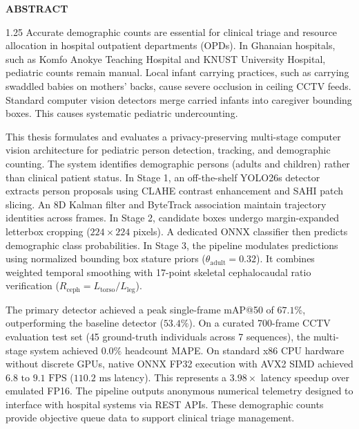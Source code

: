 \begin{center}
    {\bfseries\Large ABSTRACT}
\end{center}
\vspace{0.4cm}

\begin{spacing}{1.25}
Accurate demographic counts are essential for clinical triage and resource allocation in hospital outpatient departments (OPDs). In Ghanaian hospitals, such as Komfo Anokye Teaching Hospital and KNUST University Hospital, pediatric counts remain manual. Local infant carrying practices, such as carrying swaddled babies on mothers' backs, cause severe occlusion in ceiling CCTV feeds. Standard computer vision detectors merge carried infants into caregiver bounding boxes. This causes systematic pediatric undercounting.

This thesis formulates and evaluates a privacy-preserving multi-stage computer vision architecture for pediatric person detection, tracking, and demographic counting. The system identifies demographic persons (adults and children) rather than clinical patient status. In Stage 1, an off-the-shelf YOLO26s detector extracts person proposals using CLAHE contrast enhancement and SAHI patch slicing. An 8D Kalman filter and ByteTrack association maintain trajectory identities across frames. In Stage 2, candidate boxes undergo margin-expanded letterbox cropping ($224 \times 224$ pixels). A dedicated ONNX classifier then predicts demographic class probabilities. In Stage 3, the pipeline modulates predictions using normalized bounding box stature priors ($\theta_{\text{adult}} = 0.32$). It combines weighted temporal smoothing with 17-point skeletal cephalocaudal ratio verification ($R_{\text{ceph}} = L_{\text{torso}} / L_{\text{leg}}$).

The primary detector achieved a peak single-frame mAP@50 of $67.1\%$, outperforming the baseline detector ($53.4\%$). On a curated 700-frame CCTV evaluation test set (45 ground-truth individuals across 7 sequences), the multi-stage system achieved $0.0\%$ headcount MAPE. On standard x86 CPU hardware without discrete GPUs, native ONNX FP32 execution with AVX2 SIMD achieved $6.8\text{ to } 9.1\text{ FPS}$ ($110.2\text{ ms}$ latency). This represents a $3.98\times$ latency speedup over emulated FP16. The pipeline outputs anonymous numerical telemetry designed to interface with hospital systems via REST APIs. These demographic counts provide objective queue data to support clinical triage management.
\end{spacing}